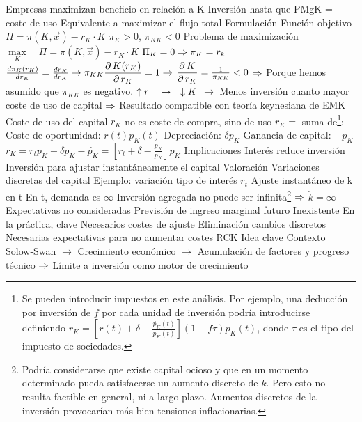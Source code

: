\documentclass{nuevotema}
\begin{document}
\begin{esquemal}
				\4[] Empresas maximizan beneficio en relación a K
				\4[] Inversión hasta que PMgK = coste de uso
				\4[] Equivalente a maximizar el flujo total
			\3 Formulación
				\4 Función objetivo
				\4[] 		 $\Pi = \pi(K, \vec{x}) - r_K \cdot K$
				\4[]  $\pi_K > 0$, $\pi_{KK}<0$
				\4 Problema de maximización
				\4[] $\underset{K}{\max} \quad \Pi = \pi(K, \vec{x}) - r_K \cdot K$
				\4[] $\Pi_K = 0 \Rightarrow \pi_K = r_k$
				\4 $\frac{d \pi_K (r_K)}{d r_K} = \frac{d r_K}{d r_K} \rightarrow \pi_{KK} \dfrac{\partial \, K(r_K)}{\partial \, r_K} = 1 \rightarrow$
				\4[] $\dfrac{\partial \, K}{\partial \, r_K} = \frac{1}{\pi_{KK}} < 0$
				\4[] $\Rightarrow$ Porque hemos asumido que $\pi_{KK}$ es negativo.
				\4[] $\uparrow r \quad \rightarrow \quad \downarrow K$
				\4[] $\to$ Menos inversión cuanto mayor coste de uso de capital
				\4[] $\Rightarrow$ Resultado compatible con teoría keynesiana de EMK
				\4 Coste de uso del capital
				\4[] $r_K$ no es coste de compra, sino de uso
				\4[]$r_K = $ suma de\footnote{Se pueden introducir impuestos en este análisis. Por ejemplo, una deducción por inversión de $f$ por cada unidad de inversión podría introducirse definiendo $r_K = \left[ r(t) + \delta - \frac{\dot{p_K}(t)}{p_K(t)} \right] ( 1- f \tau) p_K(t)$, donde $\tau$ es el tipo del impuesto de sociedades.}:
				\4[] Coste de oportunidad: $r(t) p_K(t)$
				\4[] Depreciación: $\delta p_K$
				\4[] Ganancia de capital: $-\dot{p_K}$
				\4 $r_K = r_t p_K + \delta p_K - \dot{p_K} = \left[ r_t + \delta - \frac{\dot{p_K}}{p_K} \right] p_K$
			\3 Implicaciones
				\4 Interés reduce inversión
				\4 Inversión para ajustar instantáneamente el capital
			\3 Valoración
				\4 Variaciones discretas del capital
				\4[] Ejemplo: variación tipo de interés $r_t$
				\4[] Ajuste instantáneo de k en t
				\4[] En t, demanda es $\infty$
				\4[] Inversión agregada no puede ser infinita\footnote{Podría considerarse que existe capital ocioso y que en un momento determinado pueda satisfacerse un aumento discreto de $k$. Pero esto no resulta factible en general, ni a largo plazo. Aumentos discretos de la inversión provocarían más bien tensiones inflacionarias.}
				\4[] $\Rightarrow$ $\dot{k} = \infty$
				\4 Expectativas no consideradas
				\4[] Previsión de ingreso marginal futuro
				\4[] Inexistente
				\4[] En la práctica, clave
				\4 Necesarios costes de ajuste
				\4[] Eliminación cambios discretos
				\4[] Necesarias expectativas para no aumentar costes
		\2 RCK
			\3 Idea clave
				\4 Contexto
				\4[] Solow-Swan
				\4[] $\to$ Crecimiento económico
				\4[] $\to$ Acumulación de factores y progreso técnico
				\4[] $\Rightarrow$ Límite a inversión como motor de crecimiento

\end{esquemal}
\end{document}
